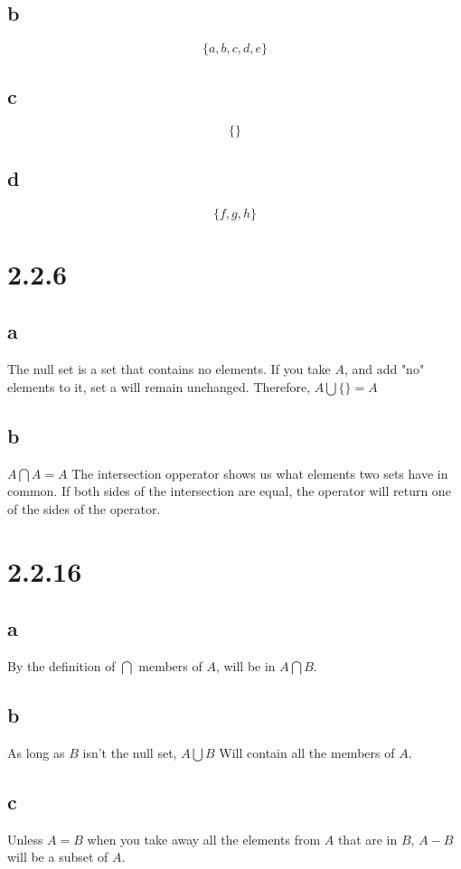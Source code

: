 \documentclass{article}
\begin{document}
{			\subsection* {b}
				\[ \{a, b, c, d, e \} \]
			\subsection* {c}
				\[ \{\} \]
			\subsection* {d}
				\[ \{f, g, h\} \]

		\section* {\Large{\textbf{2.2.6}}}
			\subsection* {a}
				The null set is a set that contains no elements. If you take $A$, and add "no" elements to it, set a will remain unchanged. Therefore, $A \bigcup \{\} = A$
			\subsection* {b}
				$A \bigcap A = A$ The intersection opperator shows us what elements two sets have in common. If both sides of the intersection are equal, the operator will return one of the sides of the operator. 

		\section* {\Large{\textbf{2.2.16}}}
			\subsection* {a}
				By the definition of $\bigcap$ members of $A$, will be in $A \bigcap B$.
			\subsection* {b}
				As long as $B$ isn't the null set, $A \bigcup B$ Will contain all the members of $A$.
			\subsection* {c}
				Unless $A=B$ when you take away all the elements from $A$ that are in $B$, $A - B$ will be a subset of $A$.

}
\end{document}
